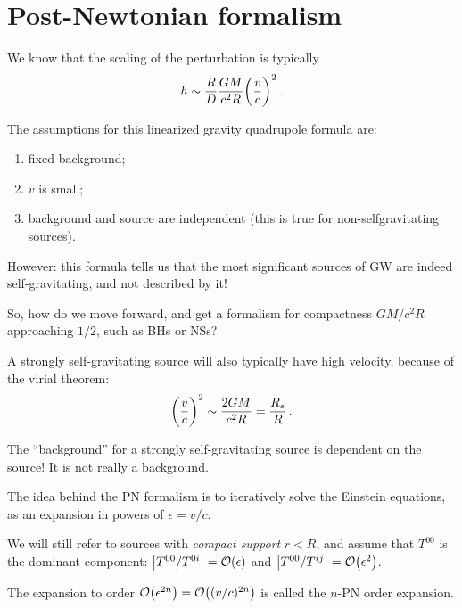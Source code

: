 \documentclass[main.tex]{subfiles}
\begin{document}
\section{Post-Newtonian formalism}


We know that the scaling of the perturbation is typically 
%
\begin{align}
h \sim \frac{R}{D} \frac{GM}{c^2 R} \qty( \frac{v}{c})^2
\,.
\end{align}

The assumptions for this linearized gravity quadrupole formula are: 
\begin{enumerate}
    \item fixed background;
    \item \(v\) is small;
    \item background and source are independent (this is true for non-selfgravitating sources).
\end{enumerate}

However: this formula tells us that the most significant sources of GW are indeed self-gravitating, and not described by it! 

So, how do we move forward, and get a formalism for compactness \(GM / c^2R\) approaching \(1/2\), such as BHs or NSs?

A strongly self-gravitating source will also typically have high velocity, because of the virial theorem: 
%
\begin{align}
\qty( \frac{v}{c})^2 \sim \frac{2GM}{c^2 R} = \frac{R_s}{R}
\,.
\end{align}


The ``background'' for a strongly self-gravitating source is dependent on the source! It is not really a background. 

The idea behind the PN formalism is to iteratively solve the Einstein equations, as an expansion in powers of \(\epsilon = v/c\). 

We will still refer to sources with \emph{compact support} \(r<R\), and assume that \(T^{00} \) is the dominant component: \(\abs{T^{00} / T^{0i}} = \order{\epsilon }\) and \(\abs{T^{00 } / T^{ij}} = \order{\epsilon^2}\). 

The expansion to order \(\order{\epsilon^{2n}} = \order{ (v/c)^{2n}}\) is called the \(n\)-PN order expansion.
\end{document}
